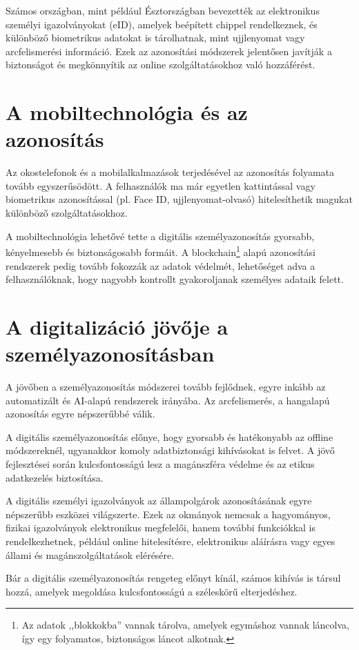 \documentclass[
]{thesis-ekf}
\theoremstyle{definition}
\theoremstyle{remark}
\begin{document}
	Számos országban, mint például Észtországban bevezették az elektronikus személyi igazolványokat (eID), amelyek beépített chippel rendelkeznek, és különböző biometrikus adatokat is tárolhatnak, mint ujjlenyomat vagy arcfelismerési információ. Ezek az azonosítási módszerek jelentősen javítják a biztonságot és megkönnyítik az online szolgáltatásokhoz való hozzáférést. \cite{magyarAzonositas}
	
	\section{A mobiltechnológia és az azonosítás}
	Az okostelefonok és a mobilalkalmazások terjedésével az azonosítás folyamata tovább egyszerűsödött. A felhasználók ma már egyetlen kattintással vagy biometrikus azonosítással (pl. Face ID, ujjlenyomat-olvasó) hitelesíthetik magukat különböző szolgáltatásokhoz.
	
	A mobiltechnológia lehetővé tette a digitális személyazonosítás gyorsabb, kényelmesebb és biztonságosabb formáit. A blockchain\footnote{Az adatok ,,blokkokba'' vannak tárolva, amelyek egymáshoz vannak láncolva, így egy folyamatos, biztonságos láncot alkotnak.} alapú azonosítási rendszerek pedig tovább fokozzák az adatok védelmét, lehetőséget adva a felhasználóknak, hogy nagyobb kontrollt gyakoroljanak személyes adataik felett.
	
	\section{A digitalizáció jövője a személyazonosításban}
	A jövőben a személyazonosítás módszerei tovább fejlődnek, egyre inkább az automatizált és AI-alapú rendszerek irányába. Az arcfelismerés, a hangalapú azonosítás egyre népszerűbbé válik.
	
	A digitális személyazonosítás előnye, hogy gyorsabb és hatékonyabb az offline módszereknél, ugyanakkor komoly adatbiztonsági kihívásokat is felvet. A jövő fejlesztései során kulcsfontosságú lesz a magánszféra védelme és az etikus adatkezelés biztosítása.
	
	A digitális személyi igazolványok az állampolgárok azonosításának egyre népszerűbb eszközei világszerte. Ezek az okmányok nemcsak a hagyományos, fizikai igazolványok elektronikus megfelelői, hanem további funkciókkal is rendelkezhetnek, például online hitelesítésre, elektronikus aláírásra vagy egyes állami és magánszolgáltatások elérésére.
	
	Bár a digitális személyazonosítás rengeteg előnyt kínál, számos kihívás is társul hozzá, amelyek megoldása kulcsfontosságú a széleskörű elterjedéshez.
\end{document}
